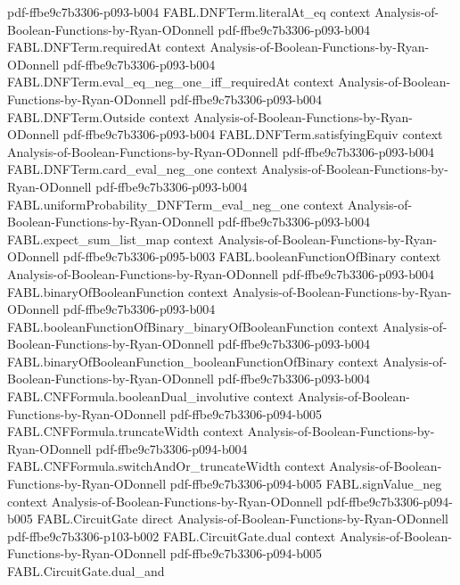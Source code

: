 \begin{theorem}
  {pdf-ffbe9c7b3306-p093-b004}
\proofstep
  {FABL.DNFTerm.literalAt_eq}
  {context}
  {Analysis-of-Boolean-Functions-by-Ryan-ODonnell}
  {pdf-ffbe9c7b3306-p093-b004}
\proofstep
  {FABL.DNFTerm.requiredAt}
  {context}
  {Analysis-of-Boolean-Functions-by-Ryan-ODonnell}
  {pdf-ffbe9c7b3306-p093-b004}
\proofstep
  {FABL.DNFTerm.eval_eq_neg_one_iff_requiredAt}
  {context}
  {Analysis-of-Boolean-Functions-by-Ryan-ODonnell}
  {pdf-ffbe9c7b3306-p093-b004}
\proofstep
  {FABL.DNFTerm.Outside}
  {context}
  {Analysis-of-Boolean-Functions-by-Ryan-ODonnell}
  {pdf-ffbe9c7b3306-p093-b004}
\proofstep
  {FABL.DNFTerm.satisfyingEquiv}
  {context}
  {Analysis-of-Boolean-Functions-by-Ryan-ODonnell}
  {pdf-ffbe9c7b3306-p093-b004}
\proofstep
  {FABL.DNFTerm.card_eval_neg_one}
  {context}
  {Analysis-of-Boolean-Functions-by-Ryan-ODonnell}
  {pdf-ffbe9c7b3306-p093-b004}
\proofstep
  {FABL.uniformProbability_DNFTerm_eval_neg_one}
  {context}
  {Analysis-of-Boolean-Functions-by-Ryan-ODonnell}
  {pdf-ffbe9c7b3306-p093-b004}
\proofstep
  {FABL.expect_sum_list_map}
  {context}
  {Analysis-of-Boolean-Functions-by-Ryan-ODonnell}
  {pdf-ffbe9c7b3306-p095-b003}
\proofstep
  {FABL.booleanFunctionOfBinary}
  {context}
  {Analysis-of-Boolean-Functions-by-Ryan-ODonnell}
  {pdf-ffbe9c7b3306-p093-b004}
\proofstep
  {FABL.binaryOfBooleanFunction}
  {context}
  {Analysis-of-Boolean-Functions-by-Ryan-ODonnell}
  {pdf-ffbe9c7b3306-p093-b004}
\proofstep
  {FABL.booleanFunctionOfBinary_binaryOfBooleanFunction}
  {context}
  {Analysis-of-Boolean-Functions-by-Ryan-ODonnell}
  {pdf-ffbe9c7b3306-p093-b004}
\proofstep
  {FABL.binaryOfBooleanFunction_booleanFunctionOfBinary}
  {context}
  {Analysis-of-Boolean-Functions-by-Ryan-ODonnell}
  {pdf-ffbe9c7b3306-p093-b004}
\proofstep
  {FABL.CNFFormula.booleanDual_involutive}
  {context}
  {Analysis-of-Boolean-Functions-by-Ryan-ODonnell}
  {pdf-ffbe9c7b3306-p094-b005}
\proofstep
  {FABL.CNFFormula.truncateWidth}
  {context}
  {Analysis-of-Boolean-Functions-by-Ryan-ODonnell}
  {pdf-ffbe9c7b3306-p094-b004}
\proofstep
  {FABL.CNFFormula.switchAndOr_truncateWidth}
  {context}
  {Analysis-of-Boolean-Functions-by-Ryan-ODonnell}
  {pdf-ffbe9c7b3306-p094-b005}
\proofstep
  {FABL.signValue_neg}
  {context}
  {Analysis-of-Boolean-Functions-by-Ryan-ODonnell}
  {pdf-ffbe9c7b3306-p094-b005}
\proofstep
  {FABL.CircuitGate}
  {direct}
  {Analysis-of-Boolean-Functions-by-Ryan-ODonnell}
  {pdf-ffbe9c7b3306-p103-b002}
\proofstep
  {FABL.CircuitGate.dual}
  {context}
  {Analysis-of-Boolean-Functions-by-Ryan-ODonnell}
  {pdf-ffbe9c7b3306-p094-b005}
\proofstep
  {FABL.CircuitGate.dual_and}

\end{theorem}
